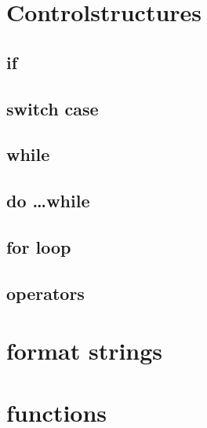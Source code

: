 \documentclass[10pt,graphics,aspectratio=169,table]{beamer}
\begin{document}
\section{Controlstructures}

\subsection{if}

\subsection{switch case}

\subsection{while}

\subsection{do \ldots while}

\subsection{for loop}

\subsection{operators}

\section{format strings}

\section{functions}
\end{document}
